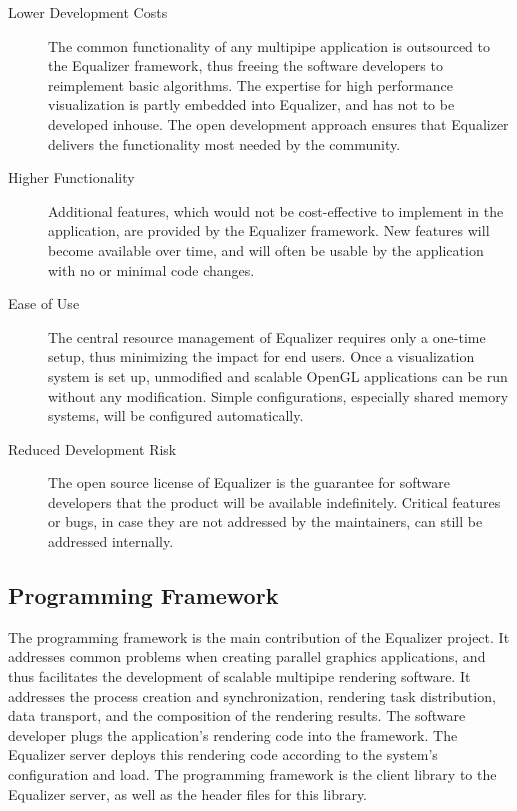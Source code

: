 \documentclass[10pt,a4paper]{scrartcl}
\begin{document}
\begin{description}
\item[Lower Development Costs] The common functionality of any multipipe
  application is outsourced to the Equalizer framework, thus freeing the
  software developers to reimplement basic algorithms. The expertise for
  high performance visualization is partly embedded into Equalizer, and
  has not to be developed inhouse. The open development approach ensures
  that Equalizer delivers the functionality most needed by the community.
\item[Higher Functionality] Additional features, which would not be
  cost-effective to implement in the application, are provided by the
  Equalizer framework. New features will become available over time,
  and will often be usable by the application with no or minimal code
  changes.
\item[Ease of Use] The central resource management of Equalizer requires
  only a one-time setup, thus minimizing the impact for end users. Once
  a visualization system is set up, unmodified and scalable OpenGL
  applications can be run without any modification. Simple
  configurations, especially shared memory systems, will be configured
  automatically.
\item[Reduced Development Risk] The open source license of Equalizer is
  the guarantee for software developers that the product will be
  available indefinitely. Critical features or bugs, in case they are
  not addressed by the maintainers, can still be addressed internally.
\end{description}

\subsection{Programming Framework}

The programming framework is the main contribution of the
Equalizer project. It addresses common problems when creating parallel
graphics applications, and thus facilitates the development of scalable
multipipe rendering software. It addresses the process creation and
synchronization, rendering task distribution, data transport, and the
composition of the rendering results. The software developer plugs the
application's rendering code into the framework. The Equalizer server
deploys this rendering code according to the system's configuration and
load. The programming framework is the client library to the Equalizer
server, as well as the header files for this library.
\end{document}
